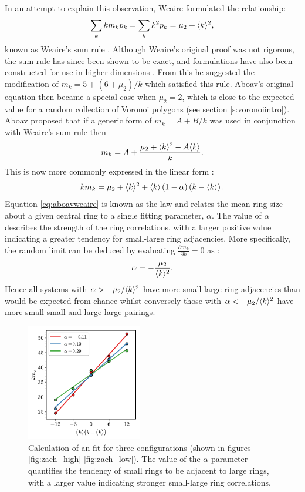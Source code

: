 In an attempt to explain this observation, Weaire formulated the %
relationship:
\begin{equation}
	\label{eq:weairesumrule}
	\sum\limits_k km_kp_k = \sum\limits_k k^2p_k = \mu_2 + \langle k \rangle^2,
\end{equation}
known as Weaire's sum rule \cite{Weaire1974}.
Although Weaire's original proof was not rigorous, the sum rule has since been shown to be exact, and formulations have also been constructed for use in higher dimensions \cite{Chiu1994}.
From this he suggested the modification of $m_k=5+\left(6+\mu_2\right)/k$ which satisfied this rule.
Aboav's original equation then became a special case when $\mu_2=2$, which is close to the expected value for a random collection of Voronoi polygons (see section \ref{s:voronoiintro}).
Aboav proposed that if a generic form of $m_k = A + B/k$ was used in conjunction with Weaire's sum rule then
\begin{equation}
	m_k = A+\frac{\mu_2+\langle k \rangle^2-A\langle k \rangle}{k}.
\end{equation}
This is now more commonly expressed in the linear form \cite{Chiu1995}:
\begin{equation}
	\label{eq:aboavweaire}
	km_k = \mu_2+\langle k \rangle^2+\langle k \rangle\left(1-\alpha\right)\left(k-\langle k \rangle\right).
\end{equation}
Equation \ref{eq:aboavweaire} is known as the \aw{} law and relates the mean ring size about a given central ring to a single fitting parameter, $\alpha$.
The value of $\alpha$ describes the strength of the ring correlations, with a larger positive value indicating a greater tendency for small\--large ring adjacencies.
More specifically, the random limit can be deduced by evaluating $\frac{\partial{m_k}}{\partial{k}}=0$ as \cite{Delannay1994}:
\begin{equation}
	\label{eq:awrandlim}
	\alpha=-\frac{\mu_2}{\langle k \rangle^2}.
\end{equation}
Hence all systems with $\alpha>-\mu_2/\langle k \rangle^2$ have more small\--large ring  adjacencies than would be expected from chance whilst conversely those with $\alpha<-\mu_2/\langle k \rangle^2$ have more small\--small and large\--large pairings.

\begin{figure}[tb]
     \centering
      \includegraphics[width=0.45\textwidth]{./figures/methods/aw_demo.pdf}
     \caption{Calculation of an \aw{} fit for three configurations (shown in figures \ref{fig:zach_high}\--\ref{fig:zach_low}). The value of the $\alpha$ parameter quantifies the tendency of small rings to be adjacent to large rings, with a larger value indicating stronger small\--large ring correlations.}
     \label{fig:awdemo}
\end{figure}

